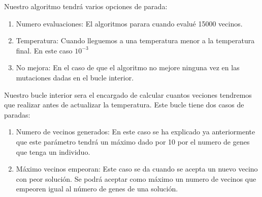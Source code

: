 \documentclass[titlepage]{article}
\begin{document}
	Nuestro algoritmo tendrá varios opciones de parada:
	
	\begin{enumerate}
		\item Numero evaluaciones: El algoritmos parara cuando evalué 15000 vecinos.
		\item Temperatura: Cuando lleguemos a una temperatura menor a la temperatura final. En este caso $10^{-3}$
		\item No mejora: En el caso de que el algoritmo no mejore ninguna vez en las mutaciones dadas en el bucle interior.
	\end{enumerate}
	
	
	Nuestro bucle interior sera el encargado de calcular cuantos veciones tendremos que realizar antes de actualizar la temperatura. Este bucle tiene dos casos de paradas:
	
	\begin{enumerate}
		\item Numero de vecinos generados: En este caso se ha explicado ya anteriormente que este parámetro tendrá un máximo dado por 10 por el numero de genes que tenga un individuo.
		
		\item Máximo vecinos empeoran: Este caso se da cuando se acepta un nuevo vecino con peor solución. Se podrá aceptar como máximo un numero de vecinos que empeoren igual al número de genes de una solución.
		
	\end{enumerate}
\end{document}
